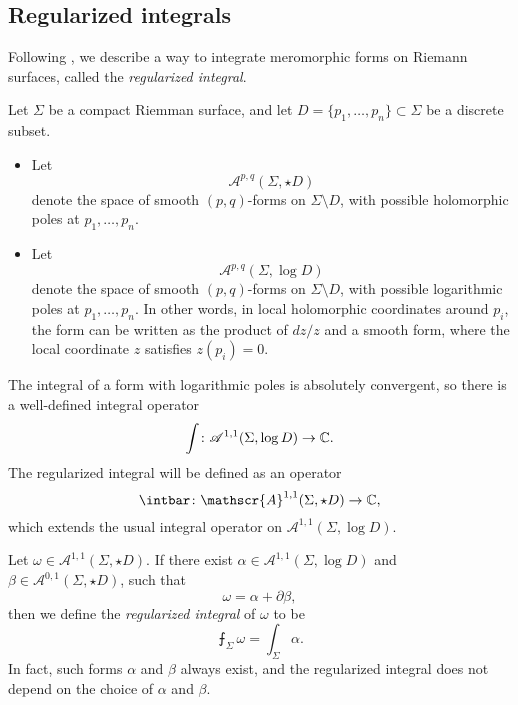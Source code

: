 \subsection{Regularized integrals}

Following \cite{regularized},
we describe a way to integrate meromorphic forms
on Riemann surfaces, called the \emph{regularized integral}.

\begin{notation}
    Let $\Sigma$ be a compact Riemman surface,
    and let $D = \{ p_1, \dotsc, p_n \} \subset \Sigma$ be a discrete subset.
    \begin{itemize}
        \item
            Let
            \[
                \mathscr{A}^{p,q} (\Sigma, \star D)
            \]
            denote the space of smooth $(p, q)$-forms on $\Sigma \setminus D$,
            with possible holomorphic poles at $p_1, \dotsc, p_n$.
        \item
            Let
            \[
                \mathscr{A}^{p,q} (\Sigma, \log D)
            \]
            denote the space of smooth $(p, q)$-forms on $\Sigma \setminus D$,
            with possible logarithmic poles at $p_1, \dotsc, p_n$.
            In other words, in local holomorphic coordinates around $p_i$,
            the form can be written as the product of $d z / z$ and a smooth form,
            where the local coordinate $z$ satisfies $z (p_i) = 0$.
            \varqed
    \end{itemize}
\end{notation}

The integral of a form with logarithmic poles
is absolutely convergent,
so there is a well-defined integral operator
\[
    \int \colon
    \mathscr{A}^{1,1} (\Sigma, \log D)
    \to \mathbb{C} .
\]
The regularized integral will be defined as an operator
\[
    \intbar \colon
    \mathscr{A}^{1,1} (\Sigma, \star D)
    \to \bbC ,
\]
which extends the usual integral operator
on $\mathscr{A}^{1,1} (\Sigma, \log D)$.

\begin{definition}
    Let $\omega \in \mathscr{A}^{1,1} (\Sigma, \star D)$.
    If there exist
    $\alpha \in \mathscr{A}^{1,1} (\Sigma, \log D)$
    and $\beta \in \mathscr{A}^{0,1} (\Sigma, \star D)$,
    such that
    \[
        \omega = \alpha + \partial \beta ,
    \]
    then we define the \emph{regularized integral} of $\omega$ to be
    \[
        \intbar_\Sigma \omega = \int_\Sigma \alpha.
    \]
    In fact, such forms $\alpha$ and $\beta$ always exist,
    and the regularized integral does not depend on
    the choice of $\alpha$ and $\beta$.
    \varqed
\end{definition}

